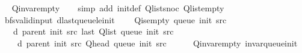 \begin{isabellebody}
\isanewline
%
\endisadeliminvisible
%
\isadelimproof
\ \ %
\endisadelimproof
%
\isatagproof
{}\isamarkupfalse%
\ Q{\isachardot}{\kern0pt}invar{\isacharunderscore}{\kern0pt}empty\isanewline
\ \ \isamarkupfalse%
\ {\isacharparenleft}{\kern0pt}simp\ add{\isacharcolon}{\kern0pt}\ init{\isacharunderscore}{\kern0pt}def\ Q{\isachardot}{\kern0pt}list{\isacharunderscore}{\kern0pt}snoc\ Q{\isachardot}{\kern0pt}list{\isacharunderscore}{\kern0pt}empty{\isacharparenright}{\kern0pt}%
\endisatagproof
{\isafoldproof}%
%
\isadelimproof
\isanewline
%
\endisadelimproof
%
\isadeliminvisible
\isanewline
%
\endisadeliminvisible
%
\isataginvisible
{}\isamarkupfalse%
\ {\isacharparenleft}{\kern0pt}\ bfs{\isacharunderscore}{\kern0pt}valid{\isacharunderscore}{\kern0pt}input{\isacharparenright}{\kern0pt}\ d{\isacharunderscore}{\kern0pt}last{\isacharunderscore}{\kern0pt}queue{\isacharunderscore}{\kern0pt}le{\isacharunderscore}{\kern0pt}init{\isacharcolon}{\kern0pt}\isanewline
\ \ \ {\isachardoublequoteopen}{\isasymnot}\ Q{\isacharunderscore}{\kern0pt}is{\isacharunderscore}{\kern0pt}empty\ {\isacharparenleft}{\kern0pt}queue\ {\isacharparenleft}{\kern0pt}init\ src{\isacharparenright}{\kern0pt}{\isacharparenright}{\kern0pt}{\isachardoublequoteclose}\isanewline
\ \ \isanewline
\ \ \ \ {\isachardoublequoteopen}d\ {\isacharparenleft}{\kern0pt}parent\ {\isacharparenleft}{\kern0pt}init\ src{\isacharparenright}{\kern0pt}{\isacharparenright}{\kern0pt}\ {\isacharparenleft}{\kern0pt}last\ {\isacharparenleft}{\kern0pt}Q{\isacharunderscore}{\kern0pt}list\ {\isacharparenleft}{\kern0pt}queue\ {\isacharparenleft}{\kern0pt}init\ src{\isacharparenright}{\kern0pt}{\isacharparenright}{\kern0pt}{\isacharparenright}{\kern0pt}{\isacharparenright}{\kern0pt}\ {\isasymle}\isanewline
\ \ \ \ \ d\ {\isacharparenleft}{\kern0pt}parent\ {\isacharparenleft}{\kern0pt}init\ src{\isacharparenright}{\kern0pt}{\isacharparenright}{\kern0pt}\ {\isacharparenleft}{\kern0pt}Q{\isacharunderscore}{\kern0pt}head\ {\isacharparenleft}{\kern0pt}queue\ {\isacharparenleft}{\kern0pt}init\ src{\isacharparenright}{\kern0pt}{\isacharparenright}{\kern0pt}{\isacharparenright}{\kern0pt}\ {\isacharplus}{\kern0pt}\ {}{\isachardoublequoteclose}%
\endisataginvisible
{\isafoldinvisible}%
%
\isadeliminvisible
\isanewline
%
\endisadeliminvisible
%
\isadelimproof
\ \ %
\endisadelimproof
%
\isatagproof
{}\isamarkupfalse%
\ Q{\isachardot}{\kern0pt}invar{\isacharunderscore}{\kern0pt}empty\ invar{\isacharunderscore}{\kern0pt}queue{\isacharunderscore}{\kern0pt}init\isanewline

\end{isabellebody}

